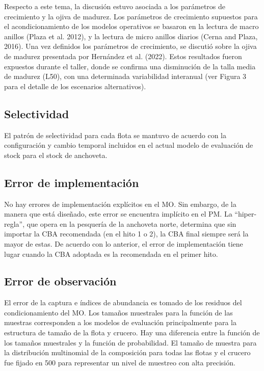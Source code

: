 Respecto a este tema, la discusión estuvo asociada a los parámetros de crecimiento y la ojiva de madurez. Los parámetros de crecimiento supuestos para el acondicionamiento de los modelos operativos se basaron en la lectura de macro anillos (Plaza et al. 2012), y la lectura de micro anillos diarios (Cerna and Plaza, 2016). Una vez definidos los parámetros de crecimiento, se discutió sobre la ojiva de madurez presentada por Hernández et al. (2022). Estos resultados fueron expuestos durante el taller, donde se confirma una disminución de la talla media de madurez (L50), con una determinada variabilidad interanual (ver Figura 3 para el detalle de los escenarios alternativos). 

\subsection{Selectividad}

El patrón de selectividad para cada flota se mantuvo de acuerdo con la configuración y cambio temporal incluidos en el actual modelo de evaluación de stock para el stock de anchoveta. 

\subsection{Error de implementación}

No hay errores de implementación explícitos en el MO. Sin embargo, de la manera que está diseñado, este error se encuentra implícito en el PM. La “hiper-regla”, que opera en la pesquería de la anchoveta norte, determina que sin importar la CBA recomendada (en el hito 1 o 2), la CBA final siempre será la mayor de estas. De acuerdo con lo anterior, el error de implementación tiene lugar cuando la CBA adoptada es la recomendada en el primer hito.  

\subsection{Error de observación}

El error de la captura e índices de abundancia es tomado de los residuos del condicionamiento del MO. Los tamaños muestrales para la función de las muestras corresponden a los modelos de evaluación principalmente para la estructura de tamaño de la flota y crucero. Hay una diferencia entre la función de los tamaños muestrales y la función de probabilidad. El tamaño de muestra para la distribución multinomial de la composición para todas las flotas y el crucero fue fijado en 500 para representar un nivel de muestreo con alta precisión.
